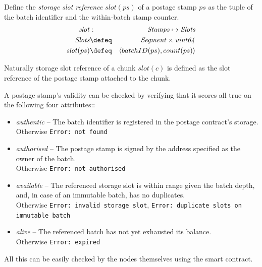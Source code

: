\begin{definition}
\label{def:slot}
Define the \emph{storage slot reference} $\mathit{slot}(ps)$ of a postage stamp $ps$ as the tuple of the batch identifier and the within-batch stamp counter.
\begin{eqnarray}
\mathit{slot}&:& \mathit{Stamps}\mapsto\mathit{Slots}\\
\mathit{Slots}&\defeq&\mathit{Segment}\times\mathit{uint64}\\
\mathit{slot}(ps) &\defeq &\langle batchID(ps),count(ps)\rangle 
\end{eqnarray}

Naturally storage slot reference of a chunk $slot(c)$ is defined as the slot reference of the postage stamp attached to the chunk.
\end{definition}



A postage stamp's validity can be checked by verifying that it scores all true on the following four attributes::

\begin{itemize}[noitemsep]
\item \emph{authentic} -- The batch identifier is registered in the postage contract's storage.\\ 
Otherwise \texttt{Error:\,not found}
\item \emph{authorised} -- The postage stamp is signed by the address specified as the owner of the batch.\\
Otherwise \texttt{Error:\,not authorised}
\item \emph{available} -- The referenced storage slot is within range given the batch depth, and, in case of an immutable batch, has no duplicates.\\
Otherwise \texttt{Error:\,invalid storage slot}, 
\texttt{Error:\,duplicate slots on   immutable batch}
\item \emph{alive} -- The referenced batch has not yet exhausted its balance.\\
Otherwise \texttt{Error:\,expired}
\end{itemize}

All this can be easily checked by the nodes themselves using the smart contract.


